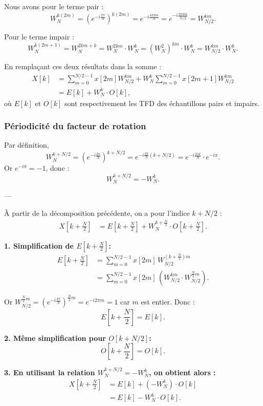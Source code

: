 Nous avons pour le terme pair :
\[
W_N^{k(2m)} = \left(e^{-i \frac{2\pi}{N}}\right)^{k(2m)}
= e^{-i \frac{4\pi km}{N}}
= e^{-i \frac{2\pi km}{N/2}}
= W_{N/2}^{km}.
\]

Pour le terme impair :
\[
W_N^{k(2m+1)}
= W_N^{2km+k}
= W_N^{2km} \cdot W_N^k
= (W_N^2)^{km} \cdot W_N^k
= W_{N/2}^{km} \cdot W_N^k.
\]

En remplaçant ces deux résultats dans la somme :
\begin{align}
X[k] &= \sum_{m=0}^{N/2-1} x[2m] W_{N/2}^{km} 
      + W_N^k \sum_{m=0}^{N/2-1} x[2m+1] W_{N/2}^{km} \\[0.8em]
&= E[k] + W_N^k \cdot O[k],
\end{align}
où $E[k]$ et $O[k]$ sont respectivement les TFD des échantillons pairs et impairs.

\subsubsection*{Périodicité du facteur de rotation}
Par définition, 
\[
W_N^{k+N/2}
= \left(e^{-i \frac{2\pi}{N}}\right)^{k+N/2}
= e^{-i \frac{2\pi}{N} (k+N/2)}
= e^{-i \frac{2\pi k}{N}} \cdot e^{-i \pi}.
\]
Or $e^{-i \pi}=-1$, donc :
\[
W_N^{k+N/2} = - W_N^k.
\]

---

À partir de la décomposition précédente, on a pour l’indice $k+N/2$ :
\begin{align}
X\left[k+\frac{N}{2}\right] 
&= E\left[k+\frac{N}{2}\right] 
  + W_N^{k+\frac{N}{2}} \cdot O\left[k+\frac{N}{2}\right].
\end{align}

\textbf{1. Simplification de $E\left[k+\frac{N}{2}\right]$:}
\begin{align}
E\left[k+\frac{N}{2}\right]
&= \sum_{m=0}^{N/2-1} x[2m] \,
   W_{N/2}^{\left(k+\frac{N}{2}\right)m} \\
&= \sum_{m=0}^{N/2-1} x[2m] \,
   \left(W_{N/2}^{km} \cdot W_{N/2}^{\frac{N}{2}m}\right).
\end{align}

Or $W_{N/2}^{\frac{N}{2}m}
= \left(e^{-i\frac{4\pi}{N}}\right)^{\frac{N}{2}m}
= e^{-i 2\pi m} = 1$ car $m$ est entier.  
Donc :
\[
E\left[k+\frac{N}{2}\right] = E[k].
\]

\textbf{2. Même simplification pour $O[k+N/2]$:}
\[
O\left[k+\frac{N}{2}\right] = O[k].
\]

\textbf{3. En utilisant la relation $W_N^{k+N/2} = -W_N^k$, on obtient alors :}
\begin{align}
X\left[k+\frac{N}{2}\right] 
&= E[k] + (-W_N^k)\cdot O[k] \\
&= E[k] - W_N^k \cdot O[k].
\end{align}

